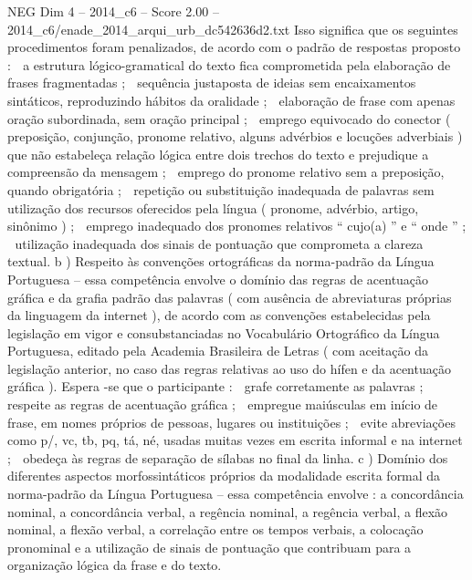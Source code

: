 \begin{textsample}{NEG Dim 4 – 2014\_c6 – Score 2.00 – 2014\_c6/enade\_2014\_arqui\_urb\_dc542636d2.txt}
Isso significa que os seguintes procedimentos foram penalizados, de acordo com o padrão de respostas proposto :  a estrutura lógico-gramatical do texto fica comprometida pela elaboração de frases fragmentadas ;  sequência justaposta de ideias sem encaixamentos sintáticos, reproduzindo hábitos da oralidade ;  elaboração de frase com apenas oração subordinada, sem oração principal ;  emprego equivocado do conector ( preposição, conjunção, pronome relativo, alguns advérbios e locuções adverbiais ) que não estabeleça relação lógica entre dois trechos do texto e prejudique a compreensão da mensagem ;  emprego do pronome relativo sem a preposição, quando obrigatória ;  repetição ou substituição inadequada de palavras sem utilização dos recursos oferecidos pela língua ( pronome, advérbio, artigo, sinônimo ) ;  emprego inadequado dos pronomes relativos “ cujo(a) ” e “ onde ” ;  utilização inadequada dos sinais de pontuação que comprometa a clareza textual. b ) Respeito às convenções ortográficas da norma-padrão da Língua Portuguesa – essa competência envolve o domínio das regras de acentuação gráfica e da grafia padrão das palavras ( com ausência de abreviaturas próprias da linguagem da internet ), de acordo com as convenções estabelecidas pela legislação em vigor e consubstanciadas no Vocabulário Ortográfico da Língua Portuguesa, editado pela Academia Brasileira de Letras ( com aceitação da legislação anterior, no caso das regras relativas ao uso do hífen e da acentuação gráfica ).
Espera -se que o participante :  grafe corretamente as palavras ;  respeite as regras de acentuação gráfica ;  empregue maiúsculas em início de frase, em nomes próprios de pessoas, lugares ou instituições ;  evite abreviações como p/, vc, tb, pq, tá, né, usadas muitas vezes em escrita informal e na internet ;  obedeça às regras de separação de sílabas no final da linha. c ) Domínio dos diferentes aspectos morfossintáticos próprios da modalidade escrita formal da norma-padrão da Língua Portuguesa – essa competência envolve : a concordância nominal, a concordância verbal, a regência nominal, a regência verbal, a flexão nominal, a flexão verbal, a correlação entre os tempos verbais, a colocação pronominal e a utilização de sinais de pontuação que contribuam para a organização lógica da frase e do texto.

\end{textsample}
